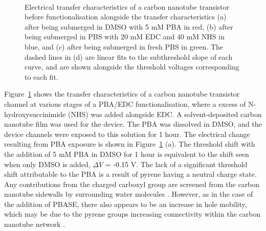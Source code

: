 \documentclass[
  a4paper,
]{scrbook}
\begin{document}
\begin{figure}
\begin{minipage}[t]{0.45\linewidth}
{{}

}

\end{minipage}%
%
\begin{minipage}[t]{0.01\linewidth}

{\centering 

~

}

\end{minipage}%

\caption{\label{fig-pba-functionalisation-threshold-shift}Electrical
transfer characteristics of a carbon nanotube transistor before
functionalisation alongside the transfer characteristics (a) after being
submerged in DMSO with 5 mM PBA in red, (b) after being submerged in PBS
with 20 mM EDC and 40 mM NHS in blue, and (c) after being submerged in
fresh PBS in green. The dashed lines in (d) are linear fits to the
subthreshold slope of each curve, and are shown alongside the threshold
voltages corresponding to each fit.}

\end{figure}

Figure~\ref{fig-pba-functionalisation-threshold-shift} shows the
transfer characteristics of a carbon nanotube transistor channel at
various stages of a PBA/EDC functionalisation, where a excess of
N-hydroxysuccinimide (NHS) was added alongside EDC. A solvent-deposited
carbon nanotube film was used for the device. The PBA was dissolved in
DMSO, and the device channels were exposed to this solution for 1 hour.
The electrical change resulting from PBA exposure is shown in
Figure~\ref{fig-pba-functionalisation-threshold-shift} (a). The
threshold shift with the addition of 5 mM PBA in DMSO for 1 hour is
equivalent to the shift seen when only DMSO is added, \(\Delta V\) =
-0.15 V. The lack of a significant threshold shift attributable to the
PBA is a result of pyrene having a neutral charge state. Any
contributions from the charged carboxyl group are screened from the
carbon nanotube sidewalls by surrounding water molecules
\autocite{Lerner2012}. However, as in the case of the addition of PBASE,
there also appears to be an increase in hole mobility, which may be due
to the pyrene groups increasing connectivity within the carbon nanotube
network \autocite{Murugathas2019a}.
\end{document}

